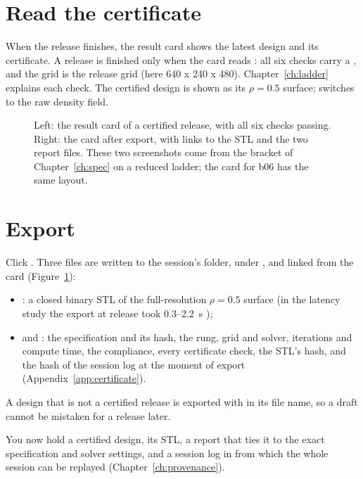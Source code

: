 \section{Read the certificate}
When the release finishes, the result card shows the latest design and its certificate. A release is finished only
when the card reads : all six checks carry a \pass, and the grid is the release grid (here
640 x 240 x 480). Chapter~\ref{ch:ladder} explains each check. The certified design is shown as its $\rho = 0.5$
surface;  switches to the raw density field.

\begin{figure}[t]
\centering
{}\hfill
{}
\caption{Left: the result card of a certified release, with all six checks passing. Right: the card after export,
with links to the STL and the two report files. These two screenshots come from the bracket of
Chapter~\ref{ch:spec} on a reduced ladder; the card for b06 has the same layout.}
\label{fig:qs-card}
\end{figure}

\section{Export}
Click . Three files are written to the session's  folder, under
, and linked from the card (Figure~\ref{fig:qs-card}):

\begin{itemize}
  \item {}: a closed binary STL of the full-resolution $\rho = 0.5$ surface
  (in the latency study the export at release took 0.3--2.2~s );
  \item {} and : the specification and its hash,
  the rung, grid and solver, iterations and compute time, the compliance, every certificate check, the STL's hash, and
  the hash of the session log at the moment of export (Appendix~\ref{app:certificate}).
\end{itemize}

A design that is not a certified release is exported with  in its file name, so a draft cannot be
mistaken for a release later.

\begin{tipbox}
You now hold a certified design, its STL, a report that ties it to the exact specification and solver settings, and a
session log in  from which the whole session can be replayed
(Chapter~\ref{ch:provenance}).
\end{tipbox}

